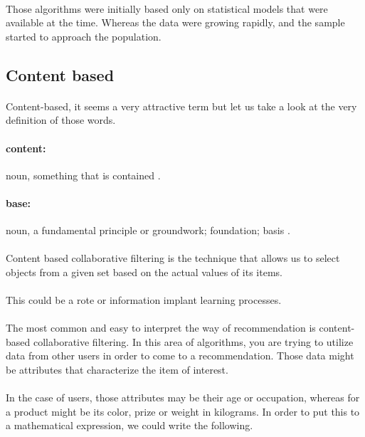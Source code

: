 \paragraph{} Those algorithms were initially based only on statistical models that were available at the time. Whereas the data were growing rapidly, and the sample started to approach the population.
\subsection{Content based}
\paragraph{} Content-based, it seems a very attractive term but let us take a look at the very definition of those words.
\paragraph{content:} noun, something that is contained \cite{Dictionary.com2017}.
\paragraph{base:} noun, a fundamental principle or groundwork; foundation; basis \cite{Dictionary.com2017}.

\paragraph{}Content based collaborative filtering is the technique that allows us to select objects from a given set based on the actual values of its items.
\paragraph{} This could be a rote or information implant learning processes.

\paragraph{}The most common and easy to interpret the way of recommendation is content-based collaborative filtering. In this area of algorithms, you are trying to utilize data from other users in order to come to a recommendation. Those data might be attributes that characterize the item of interest. 
\paragraph{}In the case of users, those attributes may be their age or occupation, whereas for a product might be its color, prize or weight in kilograms. In order to put this to a mathematical expression, we could write the following.

